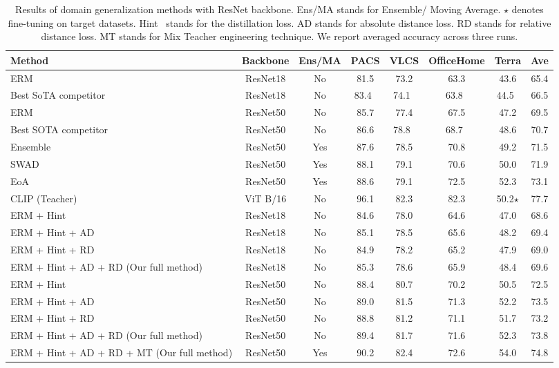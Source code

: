 \documentclass[10pt,twocolumn,letterpaper]{article}
\begin{document}
\begin{table*}[h]
\caption{Results of domain generalization methods with ResNet backbone. Ens/MA stands for Ensemble/ Moving Average. $\star$ denotes fine-tuning on target datasets. Hint~\cite{hinton2015distilling} stands for the distillation loss. AD stands for absolute distance loss. RD stands for relative distance loss. MT stands for Mix Teacher engineering technique. We report averaged accuracy across three runs.} 
\vspace{5pt}
\label{table:DGmethods} 
\footnotesize
\centering 
\begin{tabular}{l|c | c | c c c c | c} 
\hline 
Method& Backbone & Ens/MA & PACS & VLCS & OfficeHome & Terra  & Ave\\ [0.5ex] 
\hline \hline
ERM  \cite{ye2022ood}& ResNet18 & No & 81.5 & 73.2 & 63.3 & 43.6  & 65.4\\
Best SoTA competitor& ResNet18 &No & 83.4~\cite{huang2022two} & 74.1~\cite{huang2022two} & 63.8~\cite{li2018domain} & 44.5~\cite{huang2022two} & 66.5  \\
\hline
ERM ~\cite{gulrajani2020search}& ResNet50 & No & 85.7 & 77.4 & 67.5 & 47.2  &69.5 \\ 
Best SOTA competitor & ResNet50 & No & 86.6 \cite{seo2020learning}& 78.8~\cite{sun2016deep} & 68.7~\cite{sun2016deep} & 48.6 \cite{nam2021reducing} & 70.7\\
\hline
Ensemble \cite{arpit2021ensemble}& ResNet50 & Yes & 87.6 & 78.5 & 70.8 & 49.2 & 71.5 \\
SWAD \cite{cha2021swad} & ResNet50 & Yes & 88.1 & 79.1 & 70.6 & 50.0 & 71.9 \\
EoA \cite{arpit2021ensemble} & ResNet50  & Yes & 88.6  & 79.1 & 72.5 & 52.3 & 73.1 \\
\hline \hline
CLIP \cite{zhang2021domain} (Teacher) & ViT B/16 & No &  96.1 & 82.3 & 82.3 & 50.2$\star$ & 77.7  \\
\hline
ERM + Hint & ResNet18 & No & 84.6 & 78.0 & 64.6 & 47.0 & 68.6 \\
ERM + Hint + AD       & ResNet18 & No & 85.1 & 78.5 & 65.6 & 48.2 &  69.4 \\
ERM + Hint + RD       & ResNet18 & No & 84.9 & 78.2 & 65.2 & 47.9 &  69.0\\
\rowcolor{lightgray!30}ERM + Hint + AD + RD (Our full method) & ResNet18 & No & 85.3 & 78.6  & 65.9 & 48.4 &  69.6\\
\hline
ERM + Hint & ResNet50& No & 88.4 & 80.7 & 70.2 & 50.5 &  72.5\\
ERM + Hint + AD      & ResNet50& No & 89.0 & 81.5 & 71.3 & 52.2 &  73.5\\
ERM + Hint + RD      & ResNet50& No & 88.8 & 81.2 & 71.1 & 51.7 &  73.2\\
\rowcolor{lightgray!30}ERM + Hint + AD + RD (Our full method) & ResNet50& No & 89.4 & 81.7 & 71.6 & 52.3 &   73.8\\
\rowcolor{lightgray!30}ERM + Hint + AD + RD + MT (Our full method) & ResNet50  & Yes & 90.2 & 82.4 & 72.6 & 54.0 &  74.8 \\
\hline
\end{tabular}
\end{table*}
\end{document}
